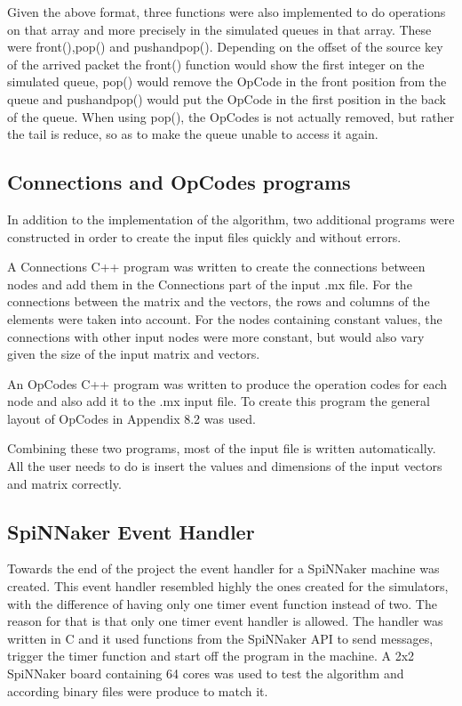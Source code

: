\documentclass[12pt,twosided]{article}
\begin{document}
Given the above format, three functions were also implemented to do operations on that array and more precisely in the simulated queues in that array. These were front(),pop() and pushandpop(). Depending on the offset of the source key of the arrived packet the front() function would show the first integer on the simulated queue, pop() would remove the OpCode in the front position from the queue and pushandpop() would put the OpCode in the first position in the back of the queue. When using pop(), the OpCodes is not actually removed, but rather the tail is reduce, so as to make the queue unable to access it again.
\subsection{Connections and OpCodes programs}
In addition to the implementation of the algorithm, two additional programs were constructed in order to create the input files quickly and without errors. 

A Connections C++ program was written to create the connections between nodes and add them in the Connections part of the input .mx file. For the connections between the matrix and the vectors, the rows and columns of the elements were taken into account. For the nodes containing constant values, the connections with other input nodes were more constant, but would also vary given the size of the input matrix and vectors. 

An OpCodes C++ program was written to produce  the operation codes for each node and also add it to the .mx input file. To create this program the general layout of OpCodes in Appendix 8.2 was used.

Combining these two programs, most of the input file is written automatically. All the user needs to do is insert the values and dimensions of the input vectors and matrix correctly.
\subsection{SpiNNaker Event Handler}
Towards the end of the project the event handler for a SpiNNaker machine was created. This event handler resembled highly the ones created for the simulators, with the difference of having only one timer event function instead of two. The reason for that is that only one timer event handler is allowed. The handler was written in C and it used functions from the SpiNNaker API to send messages, trigger the timer function and start off the program in the machine. A 2x2 SpiNNaker board containing 64 cores was used to test the algorithm and according binary files were produce to match it.
\end{document}
